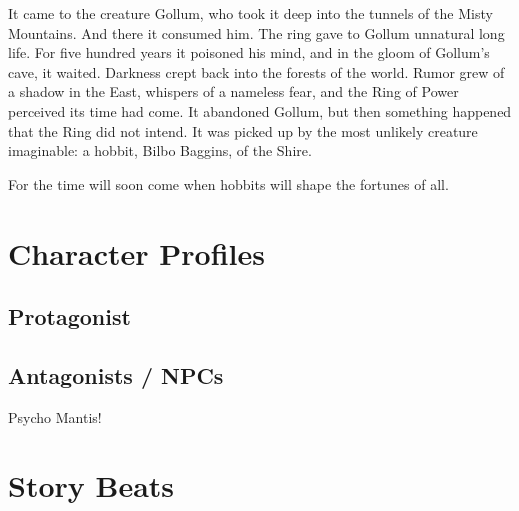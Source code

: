 It came to the creature Gollum, who took it deep into the tunnels of the Misty Mountains. And there it consumed him. The ring gave to Gollum unnatural long life. For five hundred years it poisoned his mind, and in the gloom of Gollum’s cave, it waited. Darkness crept back into the forests of the world. Rumor grew of a shadow in the East, whispers of a nameless fear, and the Ring of Power perceived its time had come. It abandoned Gollum, but then something happened that the Ring did not intend. It was picked up by the most unlikely creature imaginable: a hobbit, Bilbo Baggins, of the Shire.

For the time will soon come when hobbits will shape the fortunes of all.

\section{Character Profiles}

\subsection{Protagonist}

\lipsum[11-12]

\subsection{Antagonists / NPCs}

Psycho Mantis!

\lipsum[13]

\section{Story Beats}

\lipsum[14-20]